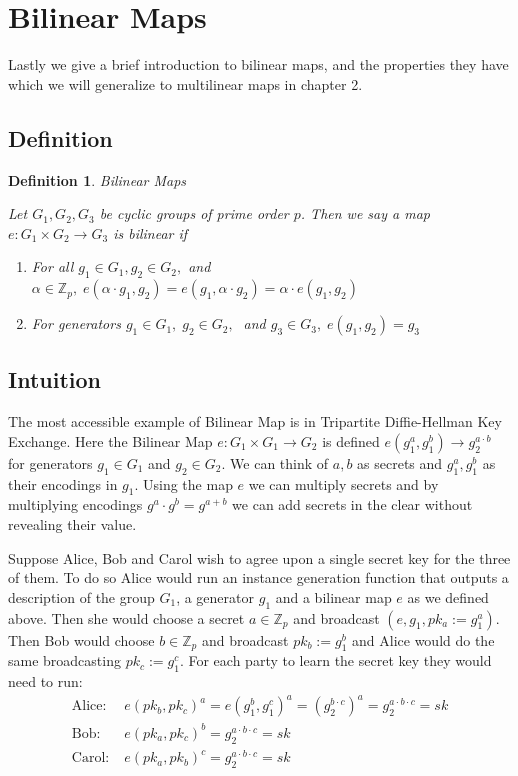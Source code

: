 \documentclass[12pt,twoside]{reedthesis}
\newtheorem{definition}{Definition}
\newcommand{\Z}[0]{\mathbb{Z}}
\begin{document}
    
    \section{Bilinear Maps}
    
    Lastly we give a brief introduction to bilinear maps, and the properties they have which we will generalize to multilinear maps in chapter 2. 
    
    \subsection{Definition}
    
    \begin{definition}{Bilinear Maps}
    \par Let $G_1,G_2,G_3$ be cyclic groups of prime order $p$. Then we say a map $e:G_1 \times G_2 \rightarrow G_3$ is bilinear if
    
    \begin{enumerate}
    \item For all $g_1 \in G_1, g_2\in G_2,$ and $ \alpha \in \Z_p, \; e(\alpha\cdot g_1,g_2) =e( g_1,\alpha\cdot g_2) = \alpha\cdot e(g_1,g_2) $
    \item For generators $g_1\in G_1, \; g_2 \in G_2, \;$ and $g_3 \in G_3,\; e(g_1,g_2) = g_3$     \end{enumerate}    
    \end{definition}
    
    \subsection{Intuition}
    \newcommand{\params}[0]{\textbf{params}}
    The most accessible example of Bilinear Map is in Tripartite Diffie-Hellman Key Exchange. Here the Bilinear Map $e:G_1 \times G_1 \rightarrow G_2$ is defined $e(g_1^a,g_1^b) \rightarrow g_2^{a\cdot b}$ for generators $g_1\in G_1$ and $g_2 \in G_2$. We can think of $a,b$ as secrets and $g_1^a,g_1^b$ as their encodings in $g_1$. Using the map $e$ we can multiply secrets and by multiplying encodings $g^a\cdot g^b = g^{a+b}$ we can add secrets in the clear without revealing their value.
\par Suppose Alice, Bob and Carol wish to agree upon a single secret key for the three of them. To do so Alice would run an instance generation function that outputs a description of the group $G_1$, a generator $g_1$ and a bilinear map $e$ as we defined above. Then she would choose a secret $a \in \Z_p$ and broadcast $(e, g_1, pk_a := g_1^a)$. Then Bob would choose $b\in \Z_p$ and broadcast $pk_b := g_1^b$ and Alice would do the same broadcasting $pk_c := g_1^c$. For each party to learn the secret key they would need to run:
\begin{align*}
\text{Alice:} & \; e(pk_b,pk_c)^a = e(g_1^b,g_1^c)^a = ( g_2^{b\cdot c} )^a = g_2^{a\cdot b \cdot c} = sk\\
\text{Bob:} &\; e(pk_a,pk_c)^b = g_2^{a \cdot b \cdot c} = sk \\
\text{Carol:}& \; e(pk_a,pk_b)^c = g_2^{a \cdot b \cdot c} = sk
\end{align*}
\end{document}
